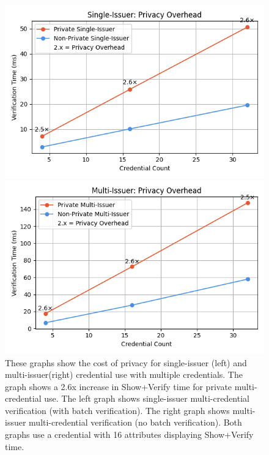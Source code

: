 \begin{figure}
    \centering
   
    \begin{minipage}{0.48\textwidth}
        \centering
        \includegraphics[width=\textwidth]{figures/chap3_single_issuer_privacy_overhead.png}
    \end{minipage}
    \hfill
    \begin{minipage}{0.48\textwidth}
        \centering
        \includegraphics[width=\textwidth]{figures/chap3_multi_issuer_privacy_overhead.png}
    \end{minipage}
    
    \caption[The Cost of Privacy for Multi-Credential Verifiable Presentations]{These graphs show the cost of privacy for single-issuer (left) and multi-issuer(right) credential use with multiple credentials. The graph shows a 2.6x increase in Show+Verify time for private multi-credential use. The left graph shows single-issuer multi-credential verification (with batch verification). The right graph shows multi-issuer multi-credential verification (no batch verification). Both graphs use a credential with 16 attributes displaying Show+Verify time.}
    \label{fig:chap3_privacy_overhead_graphs}
\end{figure}





